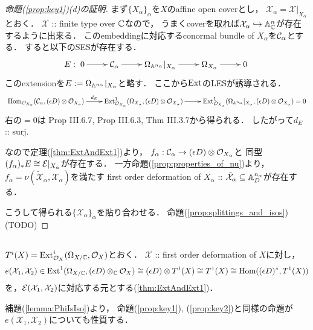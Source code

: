 \documentclass[a4paper]{jsarticle}
\newcommand{\defX}{\mathcal{X}}
\begin{document}
    \begin{proof}[命題(\ref{prop:key1})(d)の証明]
        まず$\{X_{\alpha}\}_{\alpha}$を$X$のaffine open coverとし，
        $\defX_{\alpha}=\defX|_{X_{\alpha}}$とおく．
        $\defX$ :: finite type over $\mathbb{C}$なので，
        うまくcoverを取れば$\defX_{\alpha} \inclmap \affine^{n}_{\C}$が存在するように出来る．
        このembeddingに対応するconormal bundle of $X_{\alpha}$を$\mathcal{C}_{\alpha}$とする．
        すると以下のSESが存在する．
        \[
            E:
        \xymatrix{
            0 \ar[r]& \shC_{\alpha} \ar[r]& \shDer_{\affine^{n_{\alpha}}}|_{X_{\alpha}} \ar[r]& 
            \shDer_{X_{\alpha}} \ar[r]& 0
        }\]
        このextensionを$E:=\Omega_{\mathbb{A}^{n_{\alpha}}}|_{X_{\alpha}}$と略す．
        ここから$\operatorname{Ext}$のLESが誘導される．
        \[\xymatrix{
            \Hom_{\shO_{X_{\alpha}}}(\shC_{\alpha}, (\epsilon D) \otimes \shO_{X_{\alpha}})
            \ar[r]^-{d_{E}}&
            \Ext^1_{\shO_{X_{\alpha}}}(\shDer_{X_{\alpha}}, (\epsilon D) \otimes \shO_{X_{\alpha}})
            \ar[r]&
            \Ext^1_{\shO_{X_{\alpha}}}(\shDer_{\affine^{n_{\alpha}}}|_{X_{\alpha}},
                (\epsilon D) \otimes \shO_{X_{\alpha}})
            =0
        }\]
        右の$=0$は\cite{HarAG} Prop III.6.7, Prop III.6.3, Thm III.3.7から得られる．
        したがって$d_{E}$ :: surj.
        
        なので定理(\ref{thm:ExtAndExt1})より，
        $f_{\alpha}: \mathcal{C}_{\alpha} \to (\epsilon D) \otimes \mathcal{O}_{X_{\alpha}}$と
        同型$(f_{\alpha})_*E \cong \mathcal{E}|_{X_{\alpha}}$が存在する．
        一方命題(\ref{prop:properties_of_nu})より，
        $f_{\alpha}=\nu(\tilde{\defX}_{\alpha}, \defX_{\alpha})$を満たす
        first order deformation of $X_{\alpha}$
        :: $\tilde{\defX}_{\alpha} \subseteq \affine^{n_{\alpha}}_D$が存在する．
        
        こうして得られる$\{\defX_{\alpha}\}_{\alpha}$を貼り合わせる．
        命題(\ref{prop:splittings_and_isos})
        (TODO)
    \end{proof}

    \subsection{\tp{$e(\defX_1, \defX_2)$}{e(X1,X2)}}
    \begin{Def}
        $T^i(X)=\operatorname{Ext}^i_{\mathcal{O}_X}(\Omega_{X/\mathbb{C}}, \mathcal{O}_X)$とおく．
        $\defX$ :: first order deformation of $X$に対し，
        \[
            e(\defX_1, \defX_2)
                \in
                \Ext^1(\shDer_{X/\C}, (\epsilon D) \otimes_{\C} \shO_X)
                \iso (\epsilon D) \otimes T^1(X)
                \iso T^1(X)
                \iso \Hom((\epsilon D)^*, T^1(X))
        \]
        を，$\shE(\defX_1, \defX_2)$に対応する元とする(\ref{thm:ExtAndExt1})．
    \end{Def}
    補題(\ref{lemma:PhiIsIso})より，
    命題(\ref{prop:key1}), (\ref{prop:key2})と同様の命題が
    $e(\defX_1, \defX_2)$についても性質する．
\end{document}
